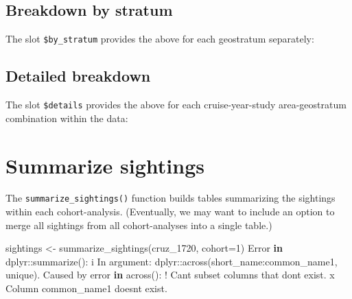 \documentclass[
]{book}
\newenvironment{Shaded}{\begin{snugshade}}{\end{snugshade}}
\newcommand{\AttributeTok}[1]{\textcolor[rgb]{0.77,0.63,0.00}{#1}}
\newcommand{\ControlFlowTok}[1]{\textcolor[rgb]{0.13,0.29,0.53}{\textbf{#1}}}
\newcommand{\DecValTok}[1]{\textcolor[rgb]{0.00,0.00,0.81}{#1}}
\newcommand{\FunctionTok}[1]{\textcolor[rgb]{0.00,0.00,0.00}{#1}}
\newcommand{\NormalTok}[1]{#1}
\newcommand{\OtherTok}[1]{\textcolor[rgb]{0.56,0.35,0.01}{#1}}
\newcommand{\SpecialCharTok}[1]{\textcolor[rgb]{0.00,0.00,0.00}{#1}}
\newcommand{\StringTok}[1]{\textcolor[rgb]{0.31,0.60,0.02}{#1}}
\begin{document}
\hypertarget{breakdown-by-stratum}{%
\subsection*{Breakdown by stratum}\label{breakdown-by-stratum}}

The slot \texttt{\$by\_stratum} provides the above for each geostratum separately:

\hypertarget{detailed-breakdown}{%
\subsection*{Detailed breakdown}\label{detailed-breakdown}}

The slot \texttt{\$details} provides the above for each cruise-year-study area-geostratum combination within the data:

\hypertarget{summarize-sightings}{%
\section*{Summarize sightings}\label{summarize-sightings}}

The \texttt{summarize\_sightings()} function builds tables summarizing the sightings within each cohort-analysis. (Eventually, we may want to include an option to merge all sightings from all cohort-analyses into a single table.)

\begin{Shaded}
\begin{Highlighting}[]
\NormalTok{sightings }\OtherTok{\textless{}{-}} \FunctionTok{summarize\_sightings}\NormalTok{(cruz\_1720,}
                                 \AttributeTok{cohort=}\DecValTok{1}\NormalTok{)}
\NormalTok{Error }\ControlFlowTok{in} \StringTok{\textasciigrave{}}\AttributeTok{dplyr::summarize()}\StringTok{\textasciigrave{}}\SpecialCharTok{:}
\NormalTok{i In argument}\SpecialCharTok{:} \StringTok{\textasciigrave{}}\AttributeTok{dplyr::across(short\_name:common\_name1, unique)}\StringTok{\textasciigrave{}}\NormalTok{.}
\NormalTok{Caused by error }\ControlFlowTok{in} \StringTok{\textasciigrave{}}\AttributeTok{across()}\StringTok{\textasciigrave{}}\SpecialCharTok{:}
\SpecialCharTok{!}\NormalTok{ Can}\StringTok{\textquotesingle{}t subset columns that don\textquotesingle{}}\NormalTok{t exist.}
\NormalTok{x Column }\StringTok{\textasciigrave{}}\AttributeTok{common\_name1}\StringTok{\textasciigrave{}}\NormalTok{ doesn}\StringTok{\textquotesingle{}t exist.}
\end{Highlighting}
\end{Shaded}
\end{document}
